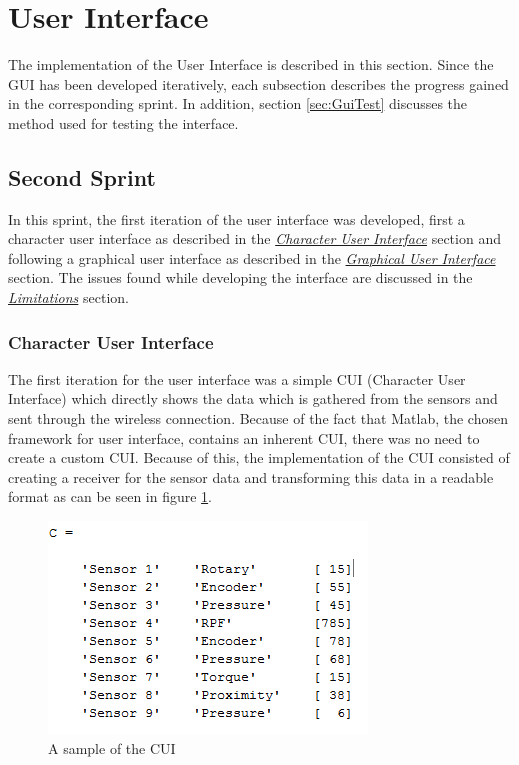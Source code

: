 \section{User Interface}
\label{sec:gui}
The implementation of the User Interface is described in this section. Since the GUI has been developed iteratively, each subsection describes the progress gained in the corresponding sprint. In addition, section \ref{sec:GuiTest} discusses the method used for testing the interface.
\subsection{Second Sprint}

In this sprint, the first iteration of the user interface was developed, first a character user interface as described in the  \hyperref[sec:CUI]{\textit{Character User Interface}} section and following a graphical user interface as described in the \hyperref[sec:GUIS1]{\textit{Graphical User Interface}} section. The issues found while developing the interface are discussed in the \hyperref[sec:LimS1]{\textit{Limitations}} section.
\subsubsection{Character User Interface}
\label{sec:CUI}
The first iteration for the user interface was a simple CUI (Character User Interface) which directly shows the data which is gathered from the sensors and sent through the wireless connection. Because of the fact that Matlab, the chosen framework for user interface, contains an inherent CUI, there was no need to create a custom CUI. Because of this, the implementation of the CUI consisted of creating a receiver for the sensor data and transforming this data in a readable format as can be seen in figure \ref{fig:CUIV1}. 

\begin{figure}[H]
	\centering
	\includegraphics[width=.75\textwidth]{images/CUI}
	\caption{A sample of the CUI} 
	\label{fig:CUIV1}
\end{figure} 

